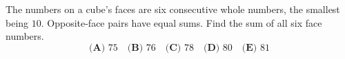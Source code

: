 The numbers on a cube's faces are six consecutive whole numbers, the smallest being $10$. Opposite-face pairs have equal sums. Find the sum of all six face numbers.
\[\textbf{(A) }75\quad\textbf{(B) }76\quad\textbf{(C) }78\quad\textbf{(D) }80\quad\textbf{(E) }81\]
